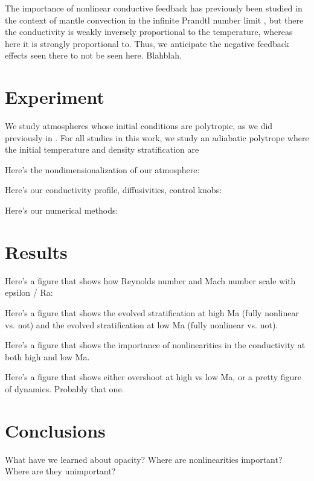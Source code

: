 \documentclass[twocolumn]{aastex62}
\begin{document}
The importance of nonlinear conductive feedback has previously been studied in
the context of mantle convection in the infinite Prandtl number limit
\citep{dubuffet&all2000}, but there the conductivity is weakly inversely proportional
to the temperature, whereas here it is strongly proportional to. Thus, we anticipate
the negative feedback effects seen there to not be seen here. Blahblah.





\section{Experiment} \label{sec:experiment}
We study atmospheres whose initial conditions are polytropic,
as we did previously in \cite{anders&brown2017}. For all studies
in this work, we study an adiabatic polytrope where the initial
temperature and density stratification are

Here's the nondimensionalization of our atmosphere:

Here's our conductivity profile, diffusivities, control knobs:

Here's our numerical methods:


\section{Results} \label{sec:results}
Here's a figure that shows how Reynolds number and Mach number
scale with epsilon / Ra:

Here's a figure that shows the evolved stratification at high Ma
(fully nonlinear vs. not) and the evolved stratification at low Ma
(fully nonlinear vs. not). 

Here's a figure that shows the importance of nonlinearities in
the conductivity at both high and low Ma.

Here's a figure that shows either overshoot at high vs low Ma, or
a pretty figure of dynamics. Probably that one.

\section{Conclusions} \label{sec:conclusions}
What have we learned about opacity? Where are nonlinearities important?
Where are they unimportant?



\end{document}
